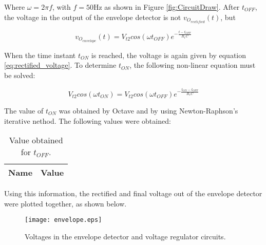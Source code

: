 Where $\omega=2\pi f$, with $f=50$Hz as shown in Figure \ref{fig:CircuitDraw}. After $t_{OFF}$, the voltage in the output of the envelope detector is not $v_{O_{rectified}}(t)$, but

\begin{equation} \label{eq:exponential_voltage}
  v_{O_{envelope}}(t)=V_{t2}cos(\omega t_{OFF})e^{-\frac{t-t_{OFF}}{R_1C}}
\end{equation}

When the time instant $t_{ON}$ is reached, the voltage is again given by equation \ref{eq:rectified_voltage}. To determine $t_{ON}$, the following non-linear equation must be solved:

\begin{equation} \label{eq:non_linear_equation_tON}
  V_{t2}cos(\omega t_{ON})=V_{t2}cos(\omega t_{OFF})e^{-\frac{t_{ON}-t_{OFF}}{R_1 C}}
\end{equation}

The value of $t_{ON}$ was obtained by Octave and by using Newton-Raphson's iterative nethod. The following values were obtained:

\begin{table}[H]
  \centering
  \begin{tabular}{|c|c|}
    \hline    
    {\bf Name} & {\bf Value} \\ \hline
    
  \end{tabular}
  \caption{Value obtained for $t_{OFF}$.}
  \label{tab:tOFF}
\end{table}

Using this information, the rectified and final voltage out of the envelope detector were plotted together, as shown below.


\begin{figure}[H] \centering
  \texttt{[image: envelope.eps]}
  \caption{Voltages in the envelope detector and voltage regulator circuits.}
  \label{fig:envelope_regulator_voltages}
\end{figure}
